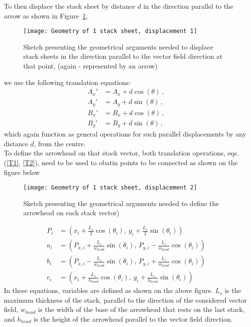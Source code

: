 \documentclass[11]{report}
\begin{document}
To then displace the stack sheet by distance $d$ in the direction parallel to the arrow as shown in Figure~\ref{fig:parallel disp.},
\begin{figure}[H]
	\centering
	\graphicspath{ {c:/Users/macus/Desktop/Uni/summer internships/Moustafa - Differential Forms/images/} }
	\texttt{[image: Geometry of 1 stack sheet, displacement 1]}
	\caption{Sketch presenting the geometrical arguments needed to displace stack sheets in the direction parallel to the vector field direction at that point, (again - represented by an arrow)}
	\label{fig:parallel disp.}
\end{figure}
\noindent we use the following translation equations:
\begin{equation}
\label{T2} \begin{split}
A_x' &= A_x + d \cos(\theta)\,, \\
A_y' &= A_y + d \sin(\theta)\,, \\
B_x' &= B_x + d \cos(\theta)\,, \\
B_y' &= B_y + d \sin(\theta)\,, 
\end{split}
\end{equation}
which again function as general operations for such parallel displacements by any distance \( d \), from the centre.\\
To define the arrowhead on that stack vector, both translation operations, eqs. (\ref{T1}, \ref{T2}), need to be used to obatin points to be connected as shown on the figure below

\begin{figure}[H]
	\centering
	\graphicspath{ {c:/Users/macus/Desktop/Uni/summer internships/Moustafa - Differential Forms/images/} }
	\texttt{[image: Geometry of 1 stack sheet, displacement 2]}
	\caption{Sketch presenting the geometrical arguments needed to define the arrowhead on each stack vector)}
	\label{fig:arrowhead gometry}
\end{figure}
\begin{align*}
P_i &= \left( x_i + \frac{L_s}{2} \cos( \theta_i) , \  y_i + \frac{L_s}{2} \sin( \theta_i) \right) \\
a_i &= \left( P_{x, i} + \frac{L_s}{w_{head}} \sin( \theta_i) , \  P_{y, i} - \frac{L_s}{w_{head}} \cos( \theta_i) \right)\\
b_i &= \left( P_{x, i} - \frac{L_s}{w_{head}} \sin( \theta_i) , \  P_{y, i} + \frac{L_s}{w_{head}} \cos( \theta_i) \right)\\ 
c_i &= \left( x_i + \frac{L_s}{h_{head}} \cos( \theta_i) , \  y_i + \frac{L_s}{h_{head}} \sin( \theta_i) \right)
\end{align*}
\noindent In these equations, variables are defined as shown on the above figure. \( L_s \) is the maximum thickness of the stack, parallel to the direction of the considered vector field, \( w_{head} \) is the width of the base of the arrowhead that rests on the last stack, and \( h_{head} \) is the height of the arrowhead parallel to the vector field direction.
\end{document}
